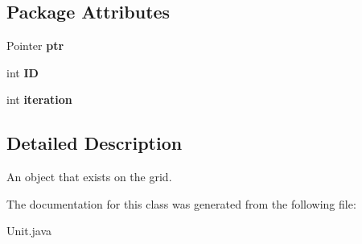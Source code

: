 \subsection*{Package Attributes}
\begin{DoxyCompactItemize}
\item 
\hypertarget{classUnit_afaff1a019fd4f591de47ce6430b313eb}{
Pointer {\bfseries ptr}}
\label{classUnit_afaff1a019fd4f591de47ce6430b313eb}

\item 
\hypertarget{classUnit_a09e449aa409230d3187fecab576c375f}{
int {\bfseries ID}}
\label{classUnit_a09e449aa409230d3187fecab576c375f}

\item 
\hypertarget{classUnit_a721e27b9282d18ef51963d6d952515b9}{
int {\bfseries iteration}}
\label{classUnit_a721e27b9282d18ef51963d6d952515b9}

\end{DoxyCompactItemize}


\subsection{Detailed Description}
An object that exists on the grid. 

The documentation for this class was generated from the following file:\begin{DoxyCompactItemize}
\item 
Unit.java\end{DoxyCompactItemize}
